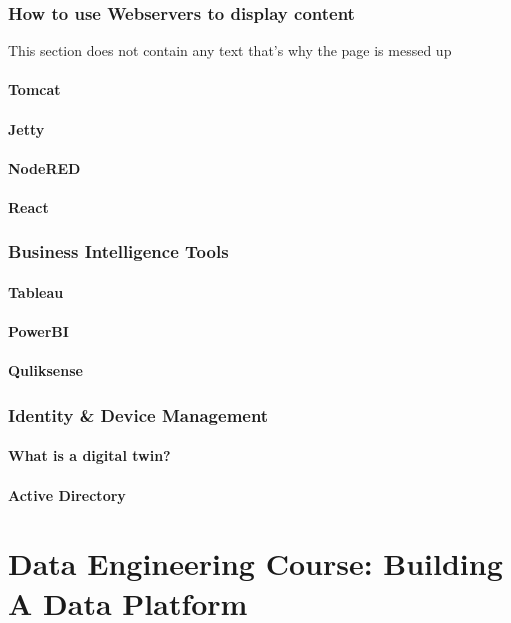 \documentclass[12pt, numbers=noenddot]{scrreprt} %
\begin{document}
\section{How to use Webservers to display content}
This section does not contain any text that's why the page is messed up
\subsection{Tomcat}
\subsection{Jetty}
\subsection{NodeRED}
\subsection{React}

\section{Business Intelligence Tools}
\subsection{Tableau}
\subsection{PowerBI}
\subsection{Quliksense}

\section{Identity \& Device Management}

\subsection{What is a digital twin?}
\subsection{Active Directory}




\part{Data Engineering Course: Building A Data Platform}
\end{document}
